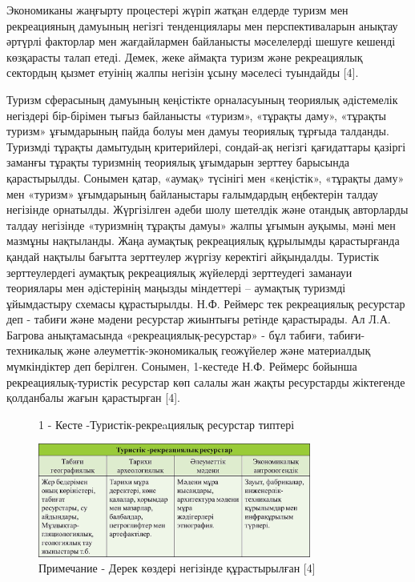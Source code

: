 \begin{multicols}{2}
Экономиканы жаңғырту процестері жүріп жатқан елдерде туризм мен
рекреацияның дамуының негізгі тенденциялары мен перспективаларын анықтау
әртүрлі факторлар мен жағдайлармен байланысты мәселелерді шешуге кешенді
көзқарасты талап етеді. Демек, жеке аймақта туризм және рекреациялық
сектордың қызмет етуінің жалпы негізін ұсыну мәселесі туындайды {[}4{]}.

Туризм сферасының дамуының кеңістікте орналасуының теориялық әдістемелік
негіздері бір-бірімен тығыз байланысты «туризм», «тұрақты даму»,
«тұрақты туризм» ұғымдарының пайда болуы мен дамуы теориялық тұрғыда
талданды. Туризмді тұрақты дамытудың критерийлері, сондай-ақ негізгі
қағидаттары қазіргі заманғы тұрақты туризмнің теориялық ұғымдарын
зерттеу барысында қарастырылды. Сонымен қатар, «аумақ» түсінігі мен
«кеңістік», «тұрақты даму» мен «туризм» ұғымдарының байланыстары
ғалымдардың еңбектерін талдау негізінде орнатылды. Жүргізілген әдеби
шолу шетелдік және отандық авторларды талдау негізінде «туризмнің
тұрақты дамуы» жалпы ұғымын ауқымы, мәні мен мазмұны нақтыланды. Жаңа
аумақтық рекреациялық құрылымды қарастырғанда қандай нақтылы бағытта
зерттеулер жүргізу керектігі айқындалды. Туристік зерттеулердегі
аумақтық рекреациялық жүйелерді зерттеудегі заманауи теориялары мен
әдістерінің маңызды міндеттері -- аумақтық туризмді ұйымдастыру схемасы
құрастырылды. Н.Ф. Реймерс тек рекреациялық ресурстар деп - табиғи және
мәдени ресурстар жиынтығы ретінде қарастырады. Ал Л.А. Багрова
анықтамасында «рекреациялық-ресурстар» - бұл табиғи, табиғи-техникалық
және әлеуметтік-экономикалық геожүйелер және материалдық мүмкіндіктер
деп берілген. Сонымен, 1-кестеде Н.Ф. Реймерс бойынша
рекреациялық-туристік ресурстар көп салалы жан жақты ресурстарды
жіктегенде қолданбалы жағын қарастырған {[}4{]}.
\end{multicols}

\begin{figure}[H]
	\caption*{1 - Кесте -Туристік-рекреaциялық ресурстар типтері}
	\centering
	\includegraphics[width=0.8\textwidth]{assets/1110}
	\caption*{Примечание - Дерек көздері негізінде құрастырылған {[}4{]}}
\end{figure}

